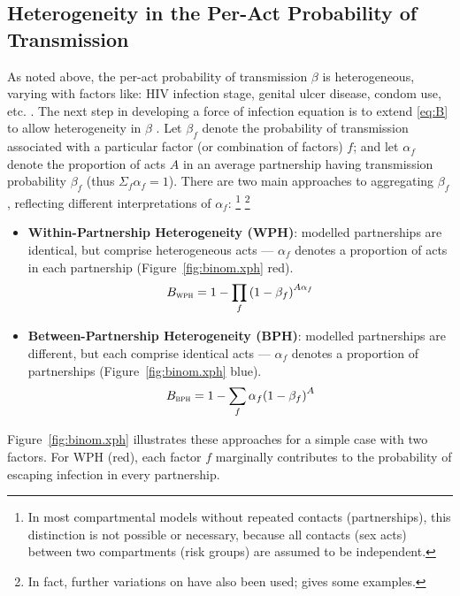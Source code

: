 \subsection{Heterogeneity in the Per-Act Probability of Transmission}\label{foi.prior.xph}
As noted above, the per-act probability of transmission $\beta$ is heterogeneous,
varying with factors like: HIV infection stage, genital ulcer disease, condom use, etc.
\cite{Boily2009,Giannou2016}.
The next step in developing a force of infection equation is to extend \eqref{eq:B}
to allow heterogeneity in $\beta$ \cite{Allard1990}.
Let $\beta_f$ denote the probability of transmission associated
with a particular factor (or combination of factors) $f$; and
let $\alpha_f$ denote the proportion of acts $A$ in an average partnership
having transmission probability $\beta_f$
(thus $\Sigma_f \alpha_f = 1$).
There are two main approaches to aggregating $\beta_f$,
reflecting different interpretations of $\alpha_f$:%
\footnote{In most compartmental models without repeated contacts (partnerships),
  this distinction is not possible or necessary, because
  all contacts (sex acts) between two compartments (risk groups) are assumed to be independent.}
\footnote{In fact, further variations on  have also been used;
   gives some examples.}
\begin{itemize}
  \item \textbf{{Within}-Partnership Heterogeneity (WPH)}:
  modelled partnerships are identical, but comprise heterogeneous acts
  --- $\alpha_f$ denotes a proportion of acts in each partnership
  (Figure~\ref{fig:binom.xph} red).
  \begin{equation}\label{eq:B.wph}
    B_{\textsc{wph}} = 1 - \prod_f {(1 - \beta_f)}^{A\alpha_f}
  \end{equation}
  \item \textbf{{Between}-Partnership Heterogeneity (BPH)}:
  modelled partnerships are different, but each comprise identical acts
  --- $\alpha_f$ denotes a proportion of partnerships
  (Figure~\ref{fig:binom.xph} blue).
  \begin{equation}\label{eq:B.bph}
    B_{\textsc{bph}} = 1 - \sum_f \alpha_f {(1 - \beta_f)}^{A}
  \end{equation}
\end{itemize}
Figure~\ref{fig:binom.xph} illustrates these approaches for a simple case with two factors.
For WPH (red), each factor $f$ marginally contributes to
the probability of escaping infection in every partnership.
